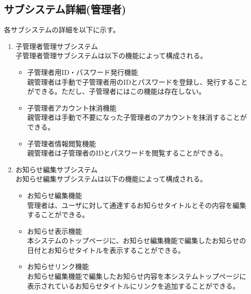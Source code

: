 \documentclass[a4j]{jarticle}
\begin{document}
\subsection{サブシステム詳細(管理者)}
各サブシステムの詳細を以下に示す。
\begin{enumerate}

  \item 子管理者管理サブシステム\\
  子管理者管理サブシステムは以下の機能によって構成される。
  \begin{itemize}
    \item 子管理者用ID・パスワード発行機能\\
    親管理者は手動で子管理者用のIDとパスワードを登録し、発行することができる。ただし、子管理者にはこの機能は存在しない。
    \item 子管理者アカウント抹消機能\\
    親管理者は手動で不要になった子管理者のアカウントを抹消することができる。
    \item 子管理者情報閲覧機能\\
    親管理者は子管理者のIDとパスワードを閲覧することができる。
  \end{itemize}


  \item お知らせ編集サブシステム\\
  お知らせ編集サブシステムは以下の機能によって構成される。
  \begin{itemize}
    \item お知らせ編集機能\\
    管理者は、ユーザに対して通達するお知らせタイトルとその内容を編集することができる。
    \item お知らせ表示機能\\
    本システムのトップページに、お知らせ編集機能で編集したお知らせの日付とお知らせタイトルを表示することができる。
    \item お知らせリンク機能\\
    お知らせ編集機能で編集したお知らせ内容を本システムトップページに表示されているお知らせタイトルにリンクを追加することができる。\\
  \end{itemize}



\end{enumerate}
\end{document}
